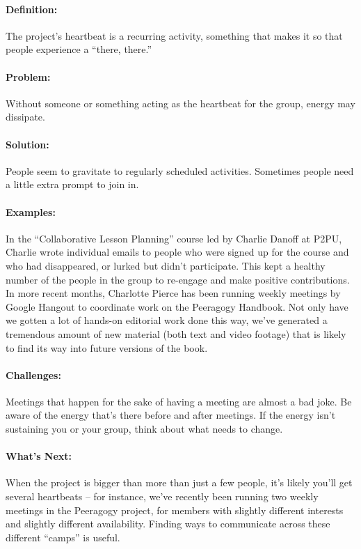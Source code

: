 \paragraph{Definition:} The project's heartbeat is a recurring activity,
something that makes it so that people experience a ``there, there.''

\paragraph{Problem:} Without someone or something acting as the heartbeat
for the group, energy may dissipate.

\paragraph{Solution:} People seem to gravitate to regularly scheduled
activities. Sometimes people need a little extra prompt to join in.

\paragraph{Examples:} In the ``Collaborative Lesson Planning'' course led
by Charlie Danoff at P2PU, Charlie wrote individual emails to people who
were signed up for the course and who had disappeared, or lurked but
didn't participate. This kept a healthy number of the people in the
group to re-engage and make positive contributions. In more recent
months, Charlotte Pierce has been running weekly meetings by Google
Hangout to coordinate work on the Peeragogy Handbook. Not only have we
gotten a lot of hands-on editorial work done this way, we've generated a
tremendous amount of new material (both text and video footage) that is
likely to find its way into future versions of the book.

\paragraph{Challenges:} Meetings that happen for the sake of having a
meeting are almost a bad joke. Be aware of the energy that's there
before and after meetings. If the energy isn't sustaining you or your
group, think about what needs to change.

\paragraph{What's Next:} When the project is bigger than more than just a
few people, it's likely you'll get several heartbeats -- for instance,
we've recently been running two weekly meetings in the Peeragogy
project, for members with slightly different interests and slightly
different availability. Finding ways to communicate across these
different ``camps'' is useful.
